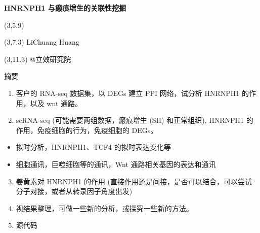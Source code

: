 \documentclass[
  ignorenonframetext,
]{beamer}
\author{}
\date{\vspace{-2.5em}}
\providecommand{\tightlist}{%
  \setlength{\itemsep}{0pt}\setlength{\parskip}{0pt}}
\begin{document}
\begin{frame}
\begin{titlepage} 
\begin{center} \textbf{\Huge HNRNPH1
与瘢痕增生的关联性挖掘} \vspace{4em}
\begin{textblock}{10}(3,5.9) \huge
\textbf{\textcolor{white}{2024-05-09}}
\end{textblock} \begin{textblock}{10}(3,7.3)
\Large \textcolor{black}{LiChuang Huang}
\end{textblock} \begin{textblock}{10}(3,11.3)
\Large \textcolor{black}{@立效研究院}
\end{textblock} \end{center} \end{titlepage}
\restoregeometry


\tableofcontents

\listoffigures

\listoftables



\end{frame}

\begin{frame}{摘要}
\protect\hypertarget{abstract}{}
\begin{enumerate}
\tightlist
\item
  客户的 RNA-seq 数据集，以 DEGs 建立 PPI 网络，试分析 HNRNPH1
  的作用，以及 wnt 通路。
\item
  scRNA-seq (可能需要两组数据，瘢痕增生 (SH) 和正常组织), HNRNPH1
  的作用，免疫细胞的行为，免疫细胞的 DEGs。
\end{enumerate}

\begin{itemize}
\tightlist
\item
  拟时分析，HNRNPH1、TCF4 的拟时表达变化等
\item
  细胞通讯，巨噬细胞等的通讯，Wnt 通路相关基因的表达和通讯
\end{itemize}

\begin{enumerate}
\setcounter{enumi}{2}
\tightlist
\item
  姜黄素对 HNRNPH1 的作用
  (直接作用还是间接，是否可以结合，可以尝试分子对接，或者从转录因子角度出发)
\item
  视结果整理，可做一些新的分析，或探究一些新的方法。
\item
  源代码
\end{enumerate}
\end{frame}
\end{document}
